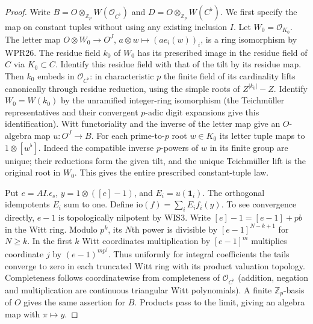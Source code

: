 \begin{proof}
Write $B=O\otimes_{\mathbb Z_p}W(\mathcal O_{C^\flat})$ and
$D=O\otimes_{\mathbb Z_p}W(C^\flat)$. We first specify the map on
constant tuples without using any existing inclusion $I$.
Let $W_0=\mathcal O_{K_0}$. The letter map
$O\otimes W_0\to O^J$, $a\otimes w\mapsto(a e_i(w))_i$,
is a ring isomorphism by WPR26. The residue field $k_0$ of $W_0$
has its prescribed image in the residue field of $C$ via $K_0\subset C$.
Identify this residue field with that of the tilt by its residue map.
Then $k_0$ embeds in $\mathcal O_{C^\flat}$: in characteristic $p$ the
finite field of its cardinality lifts canonically through residue
reduction, using the simple roots of $Z^{|k_0|}-Z$. Identify
$W_0=W(k_0)$ by the unramified integer-ring isomorphism
(the Teichm\"uller representatives and their convergent $p$-adic digit
expansions give this identification). Witt functoriality and the
inverse of the letter map give an $O$-algebra map $u:O^J\to B$.
For each prime-to-$p$ root $w\in K_0$ its letter tuple maps to
$1\otimes[w^\flat]$. Indeed the compatible inverse $p$-powers of $w$
in its finite group are unique; their reductions form the given
tilt, and the unique Teichm\"uller lift is the original root in $W_0$.
This gives the entire prescribed constant-tuple law.

Put $e=AI.\epsilon_s$, $y=1\otimes([e]-1)$, and
$E_i=u(\mathbf 1_i)$. The orthogonal idempotents $E_i$ sum to one.
Define $\mathrm{io}(f)=\sum_i E_i f_i(y)$. To see convergence directly,
$e-1$ is topologically nilpotent by WIS3. Write
$[e]-1=[e-1]+pb$ in the Witt ring. Modulo $p^k$, its $N$th power is
divisible by $[e-1]^{N-k+1}$ for $N\ge k$. In the first $k$ Witt
coordinates multiplication by $[e-1]^m$ multiplies coordinate $j$ by
$(e-1)^{mp^j}$. Thus uniformly for integral coefficients the tails
converge to zero in each truncated Witt ring with its product
valuation topology. Completeness follows coordinatewise from
completeness of $\mathcal O_{C^\flat}$ (addition, negation and
multiplication are continuous triangular Witt polynomials).
A finite $\mathbb Z_p$-basis of $O$ gives the same assertion for $B$.
Products pass to the limit, giving an algebra map with $\pi\mapsto y$.


\end{proof}
